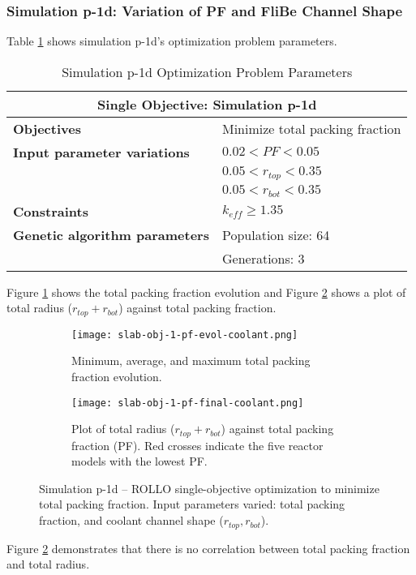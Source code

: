 \subsubsection{Simulation p-1d: Variation of PF and FliBe Channel Shape}
Table \ref{tab:simulationp1d} shows simulation p-1d's optimization problem parameters. 
\begin{table}[htbp!]
    \centering
    \onehalfspacing
    \caption{Simulation p-1d Optimization Problem Parameters}
	\label{tab:simulationp1d}
    \footnotesize
    \begin{tabular}{l|p{5cm}}
    \hline 
    \multicolumn{2}{c}{\textbf{Single Objective: Simulation p-1d}} \\
    \hline 
    \textbf{Objectives} & Minimize total packing fraction\\
    \hline 
    \textbf{Input parameter variations} & $0.02<PF<0.05$ \\
    & $0.05<r_{top}<0.35$ \\
    & $0.05<r_{bot}<0.35$ \\
    \hline
    \textbf{Constraints} & $k_{eff} \geq 1.35$\\ 
    \hline 
    \textbf{Genetic algorithm parameters} & Population size: 64 \\
    & Generations: 3 \\
    \hline
    \end{tabular}
\end{table}

Figure \ref{fig:slab-obj-1-pf-evol-coolant} shows the total packing fraction evolution 
and Figure \ref{fig:slab-obj-1-pf-final-coolant} shows a plot of total radius 
($r_{top} + r_{bot}$) against total packing fraction. 
\begin{figure}[htbp!]
    \centering
    \begin{subfigure}{\textwidth}
        \texttt{[image: slab-obj-1-pf-evol-coolant.png]}
        \caption{Minimum, average, and maximum total packing fraction evolution.}
        \label{fig:slab-obj-1-pf-evol-coolant} 
    \end{subfigure}
    \begin{subfigure}{\textwidth}
        \texttt{[image: slab-obj-1-pf-final-coolant.png]}
        \caption{Plot of total radius ($r_{top} + r_{bot}$) against total packing 
        fraction (PF). Red crosses indicate the five reactor models with the 
        lowest PF.}
        \label{fig:slab-obj-1-pf-final-coolant} 
    \end{subfigure}
    \caption{Simulation p-1d -- ROLLO single-objective optimization to minimize total 
    packing fraction. Input parameters varied: total packing fraction, and coolant 
    channel shape ($r_{top}, r_{bot}$).}
    \label{fig:slab-obj-1-pf-coolant}
\end{figure}
Figure \ref{fig:slab-obj-1-pf-final-coolant} demonstrates that there is no correlation 
between total packing fraction and total radius. 


